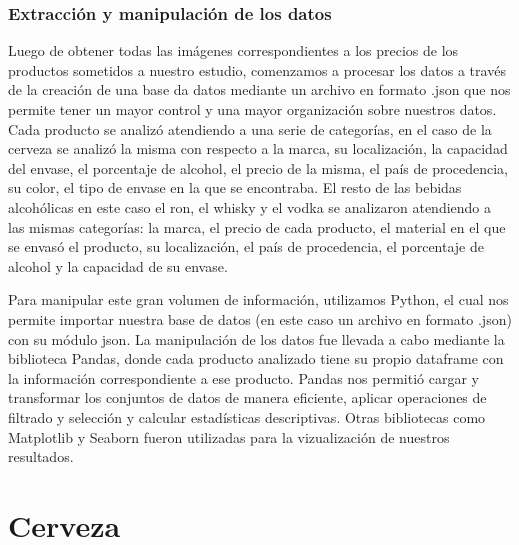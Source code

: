 \documentclass[a4paper,12pt]{article}
\begin{document}
			\subsubsection{Extracción y manipulación de los datos}
			Luego de obtener todas las imágenes correspondientes a los precios de los productos
			sometidos a nuestro estudio, comenzamos a procesar los datos a través de la creación
			de una base da datos mediante un archivo en formato .json que nos permite tener un
			mayor control y una mayor organización sobre nuestros datos. Cada producto se analizó
			atendiendo a una serie de categorías, en el caso de la cerveza se analizó la misma con
			respecto a la marca, su localización, la capacidad del envase, el porcentaje de alcohol,
			el precio de la misma, el país de procedencia, su color, el tipo de envase en la que se
			encontraba. El resto de las bebidas alcohólicas en este caso el ron, el whisky y el vodka
			se analizaron atendiendo a las mismas categorías: la marca, el precio de cada producto,
			el material en el que se envasó el producto, su localización, el país de procedencia, el
			porcentaje de alcohol y la capacidad de su envase.
		
			Para manipular este gran volumen de información, utilizamos Python, el cual nos
			permite importar nuestra base de datos (en este caso un archivo en formato .json) con
			su módulo json. La manipulación de los datos fue llevada a cabo mediante la biblioteca
			Pandas, donde cada producto analizado tiene su propio dataframe con la información correspondiente a ese producto. Pandas nos permitió cargar y transformar los conjuntos de
			datos de manera eficiente, aplicar operaciones de filtrado y selección y calcular estadísticas descriptivas. Otras bibliotecas como Matplotlib y Seaborn fueron utilizadas para la
			vizualización de nuestros resultados.
	\newpage
	\section{Cerveza}
\end{document}
